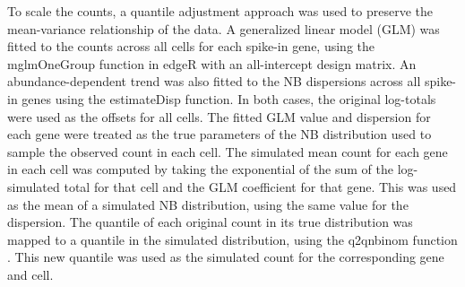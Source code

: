 \documentclass{article}
\begin{document}
To scale the counts, a quantile adjustment approach was used to preserve the mean-variance relationship of the data.
A generalized linear model (GLM) was fitted to the counts across all cells for each spike-in gene, using the mglmOneGroup function in edgeR \cite{mccarthy2012differential, robinson2010edgeR} with an all-intercept design matrix.
An abundance-dependent trend was also fitted to the NB dispersions across all spike-in genes using the estimateDisp function.
In both cases, the original log-totals were used as the offsets for all cells.
The fitted GLM value and dispersion for each gene were treated as the true parameters of the NB distribution used to sample the observed count in each cell.
The simulated mean count for each gene in each cell was computed by taking the exponential of the sum of the log-simulated total for that cell and the GLM coefficient for that gene.
This was used as the mean of a simulated NB distribution, using the same value for the dispersion.
The quantile of each original count in its true distribution was mapped to a quantile in the simulated distribution, using the q2qnbinom function \cite{robinson2008small}.
This new quantile was used as the simulated count for the corresponding gene and cell.




{\small


}
\end{document}
